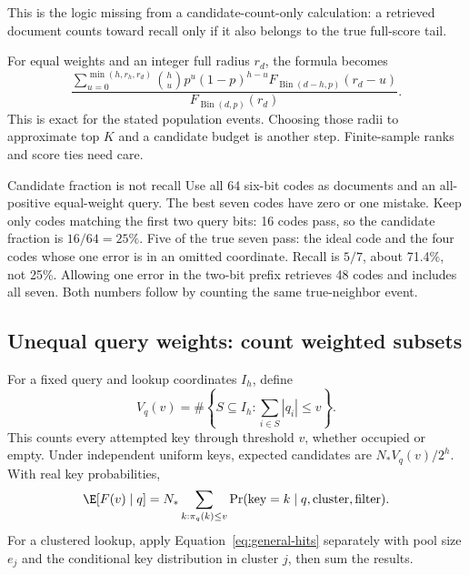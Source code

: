 This is the logic missing from a candidate-count-only calculation: a retrieved document counts
toward recall only if it also belongs to the true full-score tail.

For equal weights and an integer full radius $r_d$, the formula becomes
\begin{equation}
\frac{\displaystyle\sum_{u=0}^{\min(h,r_h,r_d)}
 \binom{h}{u}p^u(1-p)^{h-u}
 F_{\operatorname{Bin}(d-h,p)}(r_d-u)}
 {F_{\operatorname{Bin}(d,p)}(r_d)}.
\label{eq:binomial-recall}
\end{equation}
This is exact for the stated population events. Choosing those radii to approximate top $K$
and a candidate budget is another step. Finite-sample ranks and score ties need care.

\begin{examplebox}{Candidate fraction is not recall}
Use all 64 six-bit codes as documents and an all-positive equal-weight query. The best seven
codes have zero or one mistake. Keep only codes matching the first two query bits: 16 codes
pass, so the candidate fraction is $16/64=25\%$. Five of the true seven pass: the ideal code
and the four codes whose one error is in an omitted coordinate. Recall is $5/7$, about 71.4\%,
not 25\%. Allowing one error in the two-bit prefix retrieves 48 codes and includes all seven.
Both numbers follow by counting the same true-neighbor event.
\end{examplebox}

\subsection{Unequal query weights: count weighted subsets}
For a fixed query and lookup coordinates $I_h$, define
\begin{equation}
V_q(v)=\#\left\{S\subseteq I_h:\sum_{i\in S}|q_i|\leq v\right\}.
\label{eq:weighted-volume}
\end{equation}
This counts every attempted key through threshold $v$, whether occupied or empty. Under
independent uniform keys, expected candidates are $N_*V_q(v)/2^h$. With real key probabilities,
\begin{equation}
\E[F(v)\mid q]=N_*\sum_{k:\pi_q(k)\leq v}\Pr(\text{key}=k\mid q,\text{cluster},\text{filter}).
\label{eq:general-hits}
\end{equation}
For a clustered lookup, apply Equation~\eqref{eq:general-hits} separately with pool size $e_j$ and the conditional key distribution in cluster $j$, then sum the results.

